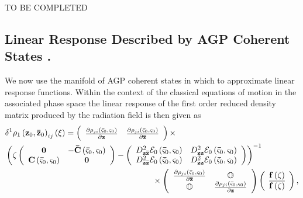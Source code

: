 \documentclass[aps,preprint]{revtex4}%
\begin{document}
\textsf{TO BE COMPLETED}

\subsection{Linear Response Described by AGP Coherent States .}

We now use the manifold of AGP coherent states in which to approximate linear
response functions. Within the context of the classical equations of motion in
the associated phase space the linear response of the first order reduced
density matrix produced by the radiation field is then given as
\begin{align}
&  \delta^{1}\rho_{1}\left(  \mathbf{z}{_{0},\mathbf{\bar{z}}_{0}}\right)
_{ij}\left(  \xi\right)  =\left(
\begin{array}
[c]{cc}%
\frac{\partial\rho_{ji}\left(  \mathbf{\bar{\varsigma}}_{0},\mathbf{\varsigma
}_{0}\right)  }{\partial\mathbf{z}} & \frac{\partial\rho_{ji}\left(
\mathbf{\bar{\varsigma}}_{0},\mathbf{\varsigma}_{0}\right)  }{\partial
\mathbf{\bar{z}}}%
\end{array}
\right)  \times\nonumber\\
&  \left(  \zeta\left(
\begin{array}
[c]{cc}%
\mathbf{0} & -\mathbf{\bar{C}}\left(  \mathbf{\bar{\varsigma}}_{0}%
,\mathbf{\varsigma}_{0}\right) \\
\mathbf{C}\left(  \mathbf{\bar{\varsigma}}_{0},\mathbf{\varsigma}_{0}\right)
& \mathbf{0}%
\end{array}
\right)  -\left(
\begin{array}
[c]{cc}%
D_{\mathbf{z\bar{z}}}^{2}\mathcal{E}_{0}\left(  \mathbf{\bar{\varsigma}}%
_{0},\mathbf{\varsigma}_{0}\right)  & D_{\mathbf{zz}}^{2}\mathcal{E}%
_{0}\left(  \mathbf{\bar{\varsigma}}_{0},\mathbf{\varsigma}_{0}\right) \\
D_{\mathbf{\bar{z}\bar{z}}}^{2}\mathcal{E}_{0}\left(  \mathbf{\bar{\varsigma}%
}_{0},\mathbf{\varsigma}_{0}\right)  & D_{\mathbf{\bar{z}z}}^{2}%
\mathcal{E}_{0}\left(  \mathbf{\bar{\varsigma}}_{0},\mathbf{\varsigma}%
_{0}\right)
\end{array}
\right)  \right)  ^{-1}\nonumber\\
&  \quad\quad\quad\quad\quad\quad\quad\quad\quad\quad\quad\quad\quad\quad
\quad\quad\quad\quad\times\left(
\begin{array}
[c]{cc}%
\frac{\partial\rho_{ji}\left(  \mathbf{\bar{\varsigma}}_{0},\mathbf{\varsigma
}_{0}\right)  }{\partial\mathbf{\bar{z}}} & \mathbb{O}\\
\mathbb{O} & \frac{\partial\rho_{ji}\left(  \mathbf{\bar{\varsigma}}%
_{0},\mathbf{\varsigma}_{0}\right)  }{\partial\mathbf{z}}%
\end{array}
\right)  \left(
\begin{array}
[c]{c}%
\mathbf{f}\left(  \zeta\right) \\
\overline{\mathbf{f}\left(  \zeta\right)  }%
\end{array}
\right)  ,
\end{align}
\end{document}
